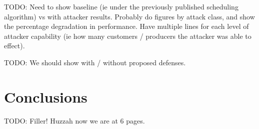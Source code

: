 \documentclass[conference]{IEEEtran}
\begin{document}
TODO: Need to show baseline (ie under the previously published scheduling algorithm) vs with attacker results.  Probably
do figures by attack class, and show the percentage degradation in performance.  Have multiple lines for each level of attacker
capability (ie how many customers / producers the attacker was able to effect).

TODO: We should show with / without proposed defenses.


\section{Conclusions}
\label{Conclusions}

TODO:  Filler!  Huzzah now we are at 6 pages.



\end{document}
